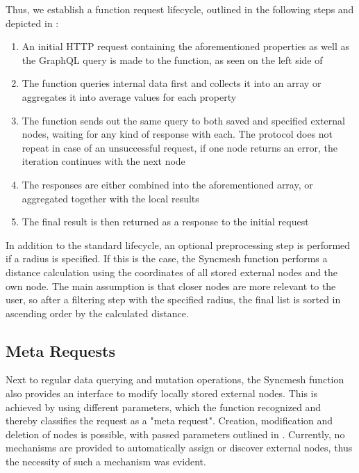 \documentclass[conference]{IEEEtran}
\begin{document}
Thus, we establish a function request lifecycle, outlined in the following steps and depicted in :

\begin{enumerate}
    \item An initial HTTP request containing the aforementioned properties as well as the GraphQL query is made to the function, as seen on the left side of 
    \item The function queries internal data first and collects it into an array or aggregates it into average values for each property
    \item The function sends out the same query to both saved and specified external nodes, waiting for any kind of response with each. The protocol does not repeat in case of an unsuccessful request, if one node returns an error, the iteration continues with the next node
    \item The responses are either combined into the aforementioned array, or aggregated together with the local results
    \item The final result is then returned as a response to the initial request
\end{enumerate}

In addition to the standard lifecycle, an optional preprocessing step is performed if a radius is specified. If this is the case, the Syncmesh function performs a distance calculation using the coordinates of all stored external nodes and the own node. The main assumption is that closer nodes are more relevant to the user, so after a filtering step with the specified radius, the final list is sorted in ascending order by the calculated distance.

\subsection{Meta Requests}\label{sec:meta-requests}
Next to regular data querying and mutation operations, the Syncmesh function also provides an interface to modify locally stored external nodes. This is achieved by using different parameters, which the function recognized and thereby classifies the request as a "meta request". Creation, modification and deletion of nodes is possible, with passed parameters outlined in . Currently, no mechanisms are provided to automatically assign or discover external nodes, thus the necessity of such a mechanism was evident.
\end{document}
